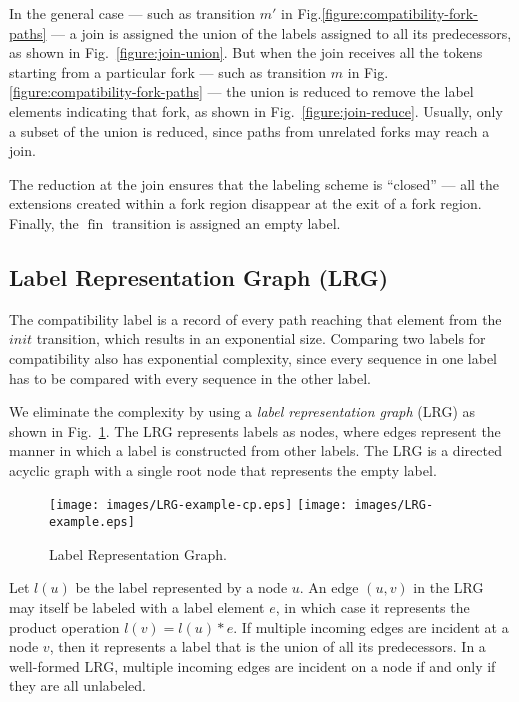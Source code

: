 \documentclass[conference]{IEEEtran}
\newcommand{\sym}[1]{$\operatorname{#1}$}
\begin{document}
In the general case --- such as transition $m'$ in
Fig.\ref{figure:compatibility-fork-paths} --- a join is assigned the
union of the labels assigned to all its predecessors, as shown in
Fig.~\ref{figure:join-union}. But when the join receives all the
tokens starting from a particular fork --- such as transition $m$ in
Fig.\ref{figure:compatibility-fork-paths} --- the union is reduced to
remove the label elements indicating that fork, as shown in
Fig.~\ref{figure:join-reduce}. Usually, only a subset of the union is
reduced, since paths from unrelated forks may reach a join.

The reduction at the join ensures that the labeling scheme is
``closed'' --- all the extensions created within a fork region
disappear at the exit of a fork region\cite{ahir_thesis}. Finally, the
\sym{fin} transition is assigned an empty label.

\subsection{Label Representation Graph (LRG)}

The compatibility label is a record of every path reaching that
element from the $init$ transition, which results in an exponential
size. Comparing two labels for compatibility also has exponential
complexity, since every sequence in one label has to be compared with
every sequence in the other label.

We eliminate the complexity by using a {\em label representation
  graph} (LRG) as shown in Fig.~\ref{figure:LRG}. The LRG represents
labels as nodes, where edges represent the manner in which a label is
constructed from other labels. The LRG is a directed acyclic graph
with a single root node that represents the empty label.

\begin{figure}[!t]
  \centering
  \texttt{[image: images/LRG-example-cp.eps]}
  \hspace{0.125in}
  \texttt{[image: images/LRG-example.eps]}
  \caption{Label Representation Graph.}
  \label{figure:LRG}
\end{figure}

Let $l(u)$ be the label represented by a node $u$. An edge $(u,v)$ in
the LRG may itself be labeled with a label element $e$, in which case
it represents the product operation $l(v) = l(u) * e$. If multiple
incoming edges are incident at a node $v$, then it represents a label
that is the union of all its predecessors. In a well-formed LRG,
multiple incoming edges are incident on a node if and only if they are
all unlabeled.
\end{document}
